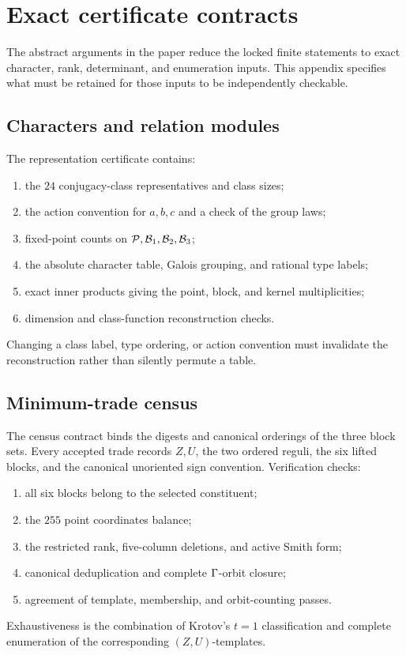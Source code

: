 \section{Exact certificate contracts}
\label{app:certificates}

The abstract arguments in the paper reduce the locked finite statements to
exact character, rank, determinant, and enumeration inputs.  This appendix
specifies what must be retained for those inputs to be independently
checkable.

\subsection{Characters and relation modules}

The representation certificate contains:
\begin{enumerate}
  \item the \(24\) conjugacy-class representatives and class sizes;
  \item the action convention for \(a,b,c\) and a check of the group laws;
  \item fixed-point counts on \(\mathcal P,\mathcal B_1,\mathcal B_2,\mathcal B_3\);
  \item the absolute character table, Galois grouping, and rational type
  labels;
  \item exact inner products giving the point, block, and kernel
  multiplicities;
  \item dimension and class-function reconstruction checks.
\end{enumerate}
Changing a class label, type ordering, or action convention must invalidate
the reconstruction rather than silently permute a table.

\subsection{Minimum-trade census}

The census contract binds the digests and canonical orderings of the three
block sets.  Every accepted trade records \(Z,U\), the two ordered reguli,
the six lifted blocks, and the canonical unoriented sign convention.
Verification checks:
\begin{enumerate}
  \item all six blocks belong to the selected constituent;
  \item the \(255\) point coordinates balance;
  \item the restricted rank, five-column deletions, and active Smith form;
  \item canonical deduplication and complete \(\Gamma\)-orbit closure;
  \item agreement of template, membership, and orbit-counting passes.
\end{enumerate}
Exhaustiveness is the combination of Krotov's \(t=1\) classification and
complete enumeration of the corresponding \((Z,U)\)-templates.

